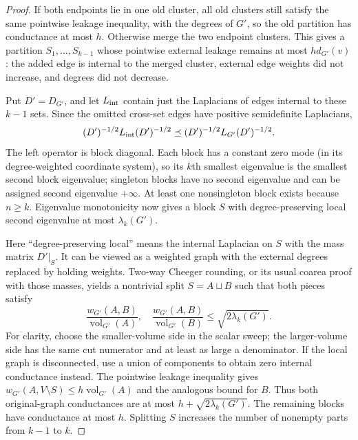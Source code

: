 \documentclass[11pt]{article}
\newcommand{\vol}{\operatorname{vol}}
\begin{document}
\begin{proof}
If both endpoints lie in one old cluster, all old clusters still satisfy
the same pointwise leakage inequality, with the degrees of $G'$, so
the old partition has conductance at most $h$.
Otherwise merge the two endpoint clusters. This gives a partition
$S_1,\ldots,S_{k-1}$ whose pointwise external leakage remains at most
$h d_{G'}(v)$: the added edge is internal to the merged cluster,
external edge weights did not increase, and degrees did not decrease.

Put $D'=D_{G'}$, and let $L_{\rm int}$ contain just the Laplacians of
edges internal to these $k-1$ sets. Since the omitted cross-set edges
have positive semidefinite Laplacians,
\[
 (D')^{-1/2}L_{\rm int}(D')^{-1/2}
 \preceq (D')^{-1/2}L_{G'}(D')^{-1/2}.
\]
The left operator is block diagonal. Each block has a constant zero
mode (in its degree-weighted coordinate system), so its $k$th smallest
eigenvalue is the smallest second block eigenvalue; singleton blocks
have no second eigenvalue and can be assigned second eigenvalue
$+\infty$. At least one nonsingleton block exists because $n\ge k$.
Eigenvalue monotonicity now gives a block $S$ with degree-preserving
local second eigenvalue at most $\lambda_k(G')$.

Here ``degree-preserving local'' means the internal Laplacian on $S$
with the mass matrix $D'|_S$. It can be viewed as a weighted graph with
the external degrees replaced by holding weights. Two-way Cheeger
rounding, or its usual coarea proof with those masses, yields a
nontrivial split $S=A\sqcup B$ such that both pieces satisfy
\[
 \frac{w_{G'}(A,B)}{\vol_{G'}(A)},\quad
 \frac{w_{G'}(A,B)}{\vol_{G'}(B)}
 \le\sqrt{2\lambda_k(G')}.
\]
For clarity, choose the smaller-volume side in the scalar sweep;
the larger-volume side has the same cut numerator and at least as
large a denominator. If the local graph is disconnected, use a union
of components to obtain zero internal conductance instead.
The pointwise leakage inequality gives
$w_{G'}(A,V\setminus S)\le h\vol_{G'}(A)$ and the analogous bound
for $B$. Thus both original-graph conductances are at most
$h+\sqrt{2\lambda_k(G')}$. The remaining blocks have conductance
at most $h$. Splitting $S$ increases the number of nonempty parts
from $k-1$ to $k$.
\end{proof}
\end{document}
